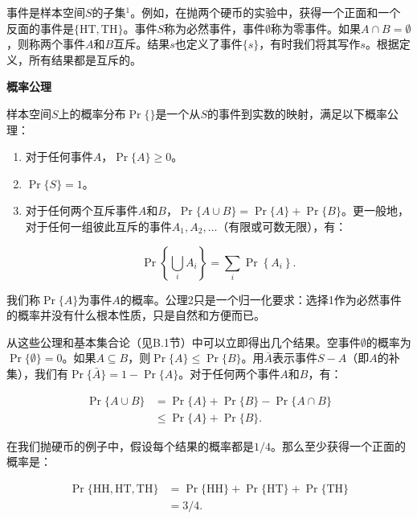 \documentclass[lang=cn,newtx,10pt,scheme=chinese]{elegantbook}
\begin{document}
事件是样本空间$S$的子集${ }^1$。例如，在抛两个硬币的实验中，获得一个正面和一个反面的事件是$\{\mathrm{HT}, \mathrm{TH}\}$。事件$S$称为必然事件，事件$\emptyset$称为零事件。如果$A \cap B=\emptyset$，则称两个事件$A$和$B$互斥。结果$s$也定义了事件$\{s\}$，有时我们将其写作$s$。根据定义，所有结果都是互斥的。

\textbf{概率公理}

样本空间$S$上的概率分布$\operatorname{Pr}\{\}$是一个从$S$的事件到实数的映射，满足以下概率公理：

\begin{enumerate}
\item 对于任何事件$A$，$\operatorname{Pr}\{A\} \geq 0$。
\item $\operatorname{Pr}\{S\}=1$。
\item 对于任何两个互斥事件$A$和$B$，$\operatorname{Pr}\{A \cup B\}=\operatorname{Pr}\{A\}+\operatorname{Pr}\{B\}$。更一般地，对于任何一组彼此互斥的事件$A_1, A_2, \ldots$（有限或可数无限），有：

$$
\operatorname{Pr}\left\{\bigcup_i A_i\right\}=\sum_i \operatorname{Pr}\left\{A_i\right\} .
$$
\end{enumerate}

我们称$\operatorname{Pr}\{A\}$为事件$A$的概率。公理2只是一个归一化要求：选择1作为必然事件的概率并没有什么根本性质，只是自然和方便而已。

从这些公理和基本集合论（见B.1节）中可以立即得出几个结果。空事件$\emptyset$的概率为$\operatorname{Pr}\{\emptyset\} = 0$。如果$A \subseteq B$，则$\operatorname{Pr}\{A\} \leq \operatorname{Pr}\{B\}$。用$\bar{A}$表示事件$S-A$（即$A$的补集），我们有$\operatorname{Pr}\{\bar{A}\}=1-\operatorname{Pr}\{A\}$。对于任何两个事件$A$和$B$，有：

$$
\begin{aligned}
\operatorname{Pr}\{A \cup B\} & =\operatorname{Pr}\{A\}+\operatorname{Pr}\{B\}-\operatorname{Pr}\{A \cap B\} \\
& \leq \operatorname{Pr}\{A\}+\operatorname{Pr}\{B\} .
\end{aligned}
$$

在我们抛硬币的例子中，假设每个结果的概率都是$1/4$。那么至少获得一个正面的概率是：

$$
\begin{aligned}
\operatorname{Pr}\{\mathrm{HH}, \mathrm{HT}, \mathrm{TH}\} & =\operatorname{Pr}\{\mathrm{HH}\}+\operatorname{Pr}\{\mathrm{HT}\}+\operatorname{Pr}\{\mathrm{TH}\} \\
& =3 / 4 .
\end{aligned}
$$
\end{document}
